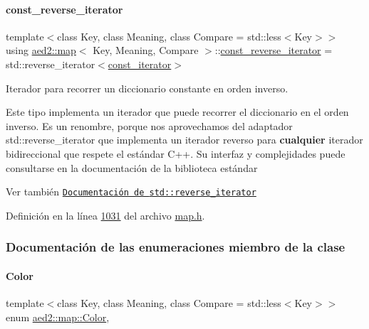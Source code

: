 \paragraph{\texorpdfstring{const\+\_\+reverse\+\_\+iterator}{const\_reverse\_iterator}}
{\footnotesize\ttfamily template$<$class Key, class Meaning, class Compare = std\+::less$<$\+Key$>$$>$ \\
using \hyperlink{classaed2_1_1map}{aed2\+::map}$<$ Key, Meaning, Compare $>$\+::\hyperlink{classaed2_1_1map_aed66a216549d13078a3ea6978ea0b768_aed66a216549d13078a3ea6978ea0b768}{const\+\_\+reverse\+\_\+iterator} =  std\+::reverse\+\_\+iterator$<$\hyperlink{classaed2_1_1map_1_1const__iterator}{const\+\_\+iterator}$>$}



Iterador para recorrer un diccionario constante en orden inverso. 

Este tipo implementa un iterador que puede recorrer el diccionario en el orden inverso. Es un renombre, porque nos aprovechamos del adaptador {\ttfamily std\+::reverse\+\_\+iterator} que implementa un iterador reverso para {\bfseries cualquier} iterador bidireccional que respete el estándar C++. Su interfaz y complejidades puede consultarse en la documentación de la biblioteca estándar

\begin{DoxySeeAlso}{Ver también}
\href{http://en.cppreference.com/w/cpp/iterator/reverse_iterator}{\tt Documentación de {\ttfamily std\+::reverse\+\_\+iterator}} 
\end{DoxySeeAlso}


Definición en la línea \hyperlink{map_8h_source_l01031}{1031} del archivo \hyperlink{map_8h_source}{map.\+h}.



\subsubsection{Documentación de las enumeraciones miembro de la clase}
\mbox{\label{classaed2_1_1map_a6d62a415a4b9d320b30cada4ebcf9f5b_a6d62a415a4b9d320b30cada4ebcf9f5b}} 
\paragraph{\texorpdfstring{Color}{Color}}
{\footnotesize\ttfamily template$<$class Key, class Meaning, class Compare = std\+::less$<$\+Key$>$$>$ \\
enum \hyperlink{classaed2_1_1map_a6d62a415a4b9d320b30cada4ebcf9f5b_a6d62a415a4b9d320b30cada4ebcf9f5b}{aed2\+::map\+::\+Color}\hspace{0.3cm}{\ttfamily [strong]}, {\ttfamily [private]}}



